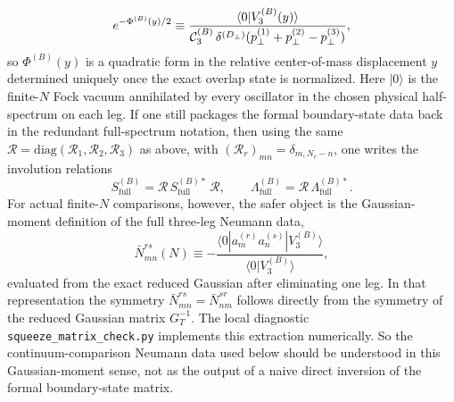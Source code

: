 \documentclass[11pt]{article}
\numberwithin{equation}{section}
\newcommand{\perpD}{D_\perp}
\begin{document}
\begin{equation}
e^{-\Phi^{(B)}(y)/2}
\equiv
\frac{\langle 0|V_3^{(B)}(y)\rangle}
{{\cal C}_3^{(B)}\,
\delta^{(\perpD)}(p_\perp^{(1)}+p_\perp^{(2)}-p_\perp^{(3)})},
\label{eq:PhiB-from-vacuum}
\end{equation}
so $\Phi^{(B)}(y)$ is a quadratic form in the relative center-of-mass displacement $y$ determined uniquely once the exact overlap state is normalized. Here $|0\rangle$ is the finite-$N$ Fock vacuum annihilated by every oscillator in the chosen physical half-spectrum on each leg. If one still packages the formal boundary-state data back in the redundant full-spectrum notation, then using the same $\mathcal R=\mathrm{diag}(\mathcal R_1,\mathcal R_2,\mathcal R_3)$ as above, with $(\mathcal R_r)_{mn}=\delta_{m,N_r-n}$, one writes the involution relations
\begin{equation}
S^{(B)}_{\mathrm{full}}=\mathcal R\,S^{(B)*}_{\mathrm{full}}\,\mathcal R,
\qquad
\Lambda^{(B)}_{\mathrm{full}}=\mathcal R\,\Lambda^{(B)*}_{\mathrm{full}}.
\label{eq:V3B-full-reality}
\end{equation}
For actual finite-$N$ comparisons, however, the safer object is the Gaussian-moment definition of the full three-leg Neumann data,
\begin{equation}
\bar N^{rs}_{mn}(N)
\equiv
-\frac{\langle 0|a_m^{(r)}a_n^{(s)}|V_3^{(B)}\rangle}
{\langle 0|V_3^{(B)}\rangle},
\label{eq:gaussian-moment-neumann}
\end{equation}
evaluated from the exact reduced Gaussian after eliminating one leg. In that representation the symmetry $\bar N^{rs}_{mn}=\bar N^{sr}_{nm}$ follows directly from the symmetry of the reduced Gaussian matrix $G_T^{-1}$. The local diagnostic \texttt{squeeze\_matrix\_check.py} implements this extraction numerically. So the continuum-comparison Neumann data used below should be understood in this Gaussian-moment sense, not as the output of a naive direct inversion of the formal boundary-state matrix.
\end{document}
